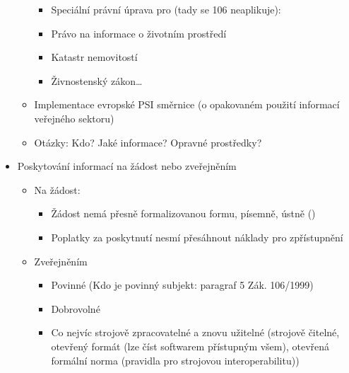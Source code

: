 \begin{itemize}
\begin{itemize}
\begin{itemize}
                              \item Speciální právní úprava pro (tady se 106 neaplikuje):
                              \item Právo na informace o životním prostředí
                              \item Katastr nemovitostí
                              \item Živnostenský zákon…
                        \end{itemize}
                  \item Implementace evropské PSI směrnice (o opakovaném použití informací veřejného
                        sektoru)
                  \item Otázky: Kdo? Jaké informace? Opravné prostředky?
            \end{itemize}
      \item Poskytování informací na žádost nebo zveřejněním
            \begin{itemize}
                  \item  Na žádost:
                        \begin{itemize}
                              \item Žádost nemá přesně formalizovanou formu, písemně, ústně ()
                              \item Poplatky za poskytnutí nesmí přesáhnout náklady pro zpřístupnění
                        \end{itemize}
                  \item Zveřejněním
                        \begin{itemize}
                              \item Povinné (Kdo je povinný subjekt: paragraf 5 Zák. 106/1999)
                              \item Dobrovolné
                              \item Co nejvíc strojově zpracovatelné a znovu užitelné (strojově čitelné, otevřený
                                    formát (lze číst softwarem přístupným všem), otevřená formální norma
                                    (pravidla pro strojovou interoperabilitu))
                        \end{itemize}
            \end{itemize}
\end{itemize}


